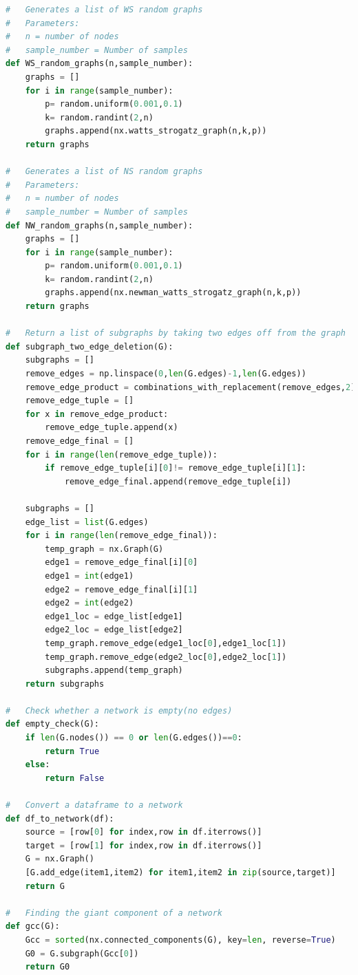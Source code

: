 \documentclass[12pt]{article}
\begin{document}
\begin{lstlisting}[language=Python,breaklines=true]
#   Generates a list of WS random graphs
#   Parameters:
#   n = number of nodes
#   sample_number = Number of samples
def WS_random_graphs(n,sample_number):
    graphs = []
    for i in range(sample_number):
        p= random.uniform(0.001,0.1)
        k= random.randint(2,n)
        graphs.append(nx.watts_strogatz_graph(n,k,p))
    return graphs

#   Generates a list of NS random graphs
#   Parameters:
#   n = number of nodes
#   sample_number = Number of samples
def NW_random_graphs(n,sample_number):
    graphs = []
    for i in range(sample_number):
        p= random.uniform(0.001,0.1)
        k= random.randint(2,n)
        graphs.append(nx.newman_watts_strogatz_graph(n,k,p))
    return graphs

#   Return a list of subgraphs by taking two edges off from the graph
def subgraph_two_edge_deletion(G):
    subgraphs = []
    remove_edges = np.linspace(0,len(G.edges)-1,len(G.edges))
    remove_edge_product = combinations_with_replacement(remove_edges,2)
    remove_edge_tuple = []
    for x in remove_edge_product:
        remove_edge_tuple.append(x)
    remove_edge_final = []
    for i in range(len(remove_edge_tuple)):
        if remove_edge_tuple[i][0]!= remove_edge_tuple[i][1]:
            remove_edge_final.append(remove_edge_tuple[i])
    
    subgraphs = []
    edge_list = list(G.edges)
    for i in range(len(remove_edge_final)):
        temp_graph = nx.Graph(G)
        edge1 = remove_edge_final[i][0]
        edge1 = int(edge1)
        edge2 = remove_edge_final[i][1]
        edge2 = int(edge2)
        edge1_loc = edge_list[edge1]
        edge2_loc = edge_list[edge2]
        temp_graph.remove_edge(edge1_loc[0],edge1_loc[1])
        temp_graph.remove_edge(edge2_loc[0],edge2_loc[1])
        subgraphs.append(temp_graph)
    return subgraphs

#   Check whether a network is empty(no edges)
def empty_check(G):
    if len(G.nodes()) == 0 or len(G.edges())==0:
        return True
    else:
        return False

#   Convert a dataframe to a network
def df_to_network(df):
    source = [row[0] for index,row in df.iterrows()]
    target = [row[1] for index,row in df.iterrows()]
    G = nx.Graph()
    [G.add_edge(item1,item2) for item1,item2 in zip(source,target)]
    return G

#   Finding the giant component of a network
def gcc(G):
    Gcc = sorted(nx.connected_components(G), key=len, reverse=True)
    G0 = G.subgraph(Gcc[0])
    return G0


\end{lstlisting}
\end{document}
